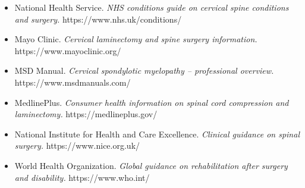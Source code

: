 \begin{itemize}
    \item National Health Service. \textit{NHS conditions guide on cervical spine conditions and surgery.} https://www.nhs.uk/conditions/
    \item Mayo Clinic. \textit{Cervical laminectomy and spine surgery information.} https://www.mayoclinic.org/
    \item MSD Manual. \textit{Cervical spondylotic myelopathy -- professional overview.} https://www.msdmanuals.com/
    \item MedlinePlus. \textit{Consumer health information on spinal cord compression and laminectomy.} https://medlineplus.gov/
    \item National Institute for Health and Care Excellence. \textit{Clinical guidance on spinal surgery.} https://www.nice.org.uk/
    \item World Health Organization. \textit{Global guidance on rehabilitation after surgery and disability.} https://www.who.int/
\end{itemize}

